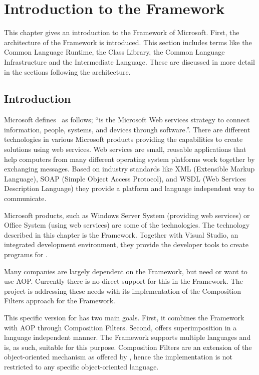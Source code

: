 \chapter{Introduction to the \dotNET Framework}
\label{chp:dotnet_platform}

This chapter gives an introduction to the \dotNET Framework of Microsoft. First, the architecture of the \dotNET Framework is introduced. This section includes terms like the Common Language Runtime, the \dotNET Class Library, the Common Language Infrastructure and the Intermediate Language. These are discussed in more detail in the sections following the architecture.

%
%
\section{Introduction}
Microsoft defines~\cite{Microsoft03-5} \dotNET as follows; ``\dotNET is the Microsoft Web services strategy to connect information, people, systems, and devices through software.''. There are different \dotNET technologies in various Microsoft products providing the capabilities to create solutions using web services. 
Web services are small, reusable applications that help computers from many different operating system platforms work together by exchanging messages. Based on industry standards like XML (Extensible Markup Language), SOAP (Simple Object Access Protocol), and WSDL (Web Services Description Language) they provide a platform and language independent way to communicate.

Microsoft products, such as Windows Server System (providing web services) or Office System (using web services) are some of the \dotNET technologies. The technology described in this chapter is the \dotNET Framework. Together with Visual Studio, an integrated development environment, they provide the developer tools to create programs for \dotNET. 

Many companies are largely dependent on the \dotNET Framework, but need or want to use AOP. Currently there is no direct support for this in the Framework. The \Compose*[.NET] project is addressing these needs with its implementation of the Composition Filters approach for the \dotNET Framework.

This specific \Compose* version for \dotNET has two main goals.
First, it combines the \dotNET Framework with AOP through Composition Filters.
Second, \Compose* offers superimposition in a language independent manner. The \dotNET Framework supports multiple languages and is, as such, suitable for this purpose.
Composition Filters are an extension of the object-oriented mechanism as offered by \dotNET, hence the implementation is not restricted to any specific object-oriented language.






